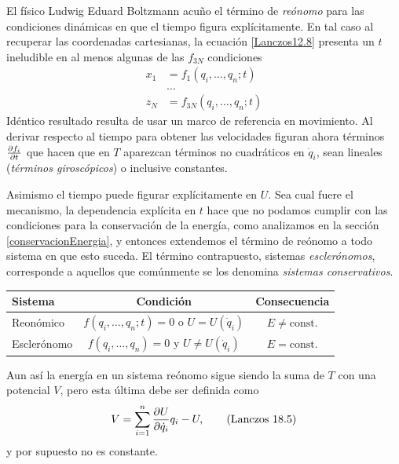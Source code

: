 \documentclass[12pt, spanish, a4paper, ]{article}
\begin{document}
El físico Ludwig Eduard Boltzmann acuño el término de \emph{reónomo} para las condiciones dinámicas en que el tiempo figura explícitamente.
En tal caso al recuperar las coordenadas cartesianas, la ecuación \eqref{Lanczos12.8} presenta un \(t\) ineludible en al menos algunas de las \(f_{3N}\) condiciones
\begin{equation}\label{Lanczos18.3}
	\begin{aligned}
		x_1 &= f_1(q_i, \ldots, q_n; t) \\
		& \ldots \\
		z_N &= f_{3N}(q_i, \ldots, q_n; t)
	\end{aligned}
	\tag{Lanczos 18.3}
\end{equation}
Idéntico resultado resulta de usar un marco de referencia en movimiento.
Al derivar respecto al tiempo para obtener las velocidades figuran ahora términos \(\pdv{f_i}{t}\) que hacen que en \(T\) aparezcan términos no cuadráticos en \(\dot{q}_i\), sean lineales (\emph{términos giroscópicos}) o inclusive constantes.

Asimismo el tiempo puede figurar explícitamente en \(U\).
Sea cual fuere el mecanismo, la dependencia explícita en \(t\) hace que no podamos cumplir con las condiciones para la conservación de la energía, como analizamos en la sección \ref{conservacionEnergia}, y entonces extendemos el término de reónomo a todo sistema en que esto suceda.
El término contrapuesto, sistemas \emph{esclerónomos}, corresponde a aquellos que comúnmente se los denomina \emph{sistemas conservativos}.

\begin{center}
  \begin{tabular}{lcc}
    \toprule
	Sistema & Condición & Consecuencia\\
	\midrule
	Reonómico & \(f(q_i,\ldots,q_n;t)= 0\) o \(U=U(\dot{q}_i)\) & \(E \neq \mathrm{const.}\) \\
	Esclerónomo & \(f(q_i,\ldots,q_n)= 0\) y \(U\neq U(\dot{q}_i)\)  & \(E =\mathrm{const.}\) \\
    \bottomrule
  \end{tabular}
\end{center}

Aun así la energía en un sistema reónomo sigue siendo la suma de \(T\) con una potencial \(V\), pero esta última debe ser definida como
\begin{equation}\label{Lanczos18.5}
	V= \sum_{i=1}^n \pdv{U}{\dot{q}_i} q_i - U ,
	\tag{Lanczos 18.5}
\end{equation} 
y por supuesto no es constante.
\end{document}
